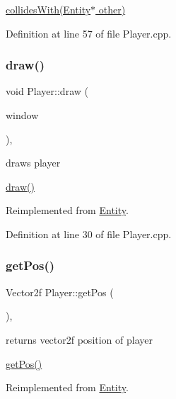 \hyperlink{class_player_a2c1775f5add97e680e7cd538e8dddda3}{collides\+With(\+Entity$\ast$ other)} 

Definition at line 57 of file Player.\+cpp.

\mbox{\label{class_player_a27ca9082a531285731af05f9395ffee8}} 
\subsubsection{\texorpdfstring{draw()}{draw()}}
{\footnotesize\ttfamily void Player\+::draw (\begin{DoxyParamCaption}\item[{Render\+Window \&}]{window }\end{DoxyParamCaption})\hspace{0.3cm}{\ttfamily [override]}, {\ttfamily [virtual]}}



draws player 

\hyperlink{class_player_a27ca9082a531285731af05f9395ffee8}{draw()} 

Reimplemented from \hyperlink{class_entity_a030c3aa6641df7981a2d8a3fba890ec7}{Entity}.



Definition at line 30 of file Player.\+cpp.

\mbox{\label{class_player_a59cfaac9d09b12a290d2e89ca656be49}} 
\subsubsection{\texorpdfstring{get\+Pos()}{getPos()}}
{\footnotesize\ttfamily Vector2f Player\+::get\+Pos (\begin{DoxyParamCaption}{ }\end{DoxyParamCaption})\hspace{0.3cm}{\ttfamily [override]}, {\ttfamily [virtual]}}



returns vector2f position of player 

\hyperlink{class_player_a59cfaac9d09b12a290d2e89ca656be49}{get\+Pos()} 

Reimplemented from \hyperlink{class_entity_a8b6080f0ab76702fcd00108aef8ea9dd}{Entity}.




